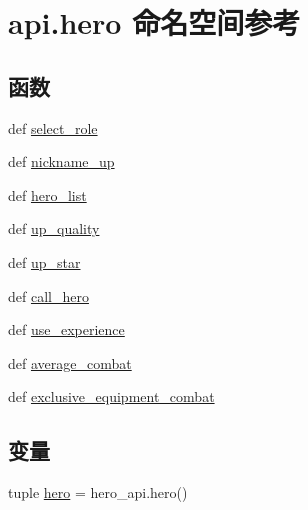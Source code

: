 \hypertarget{namespaceapi_1_1hero}{\section{api.\-hero 命名空间参考}
\label{namespaceapi_1_1hero}
}
\subsection*{函数}
\begin{DoxyCompactItemize}
\item 
def \hyperlink{namespaceapi_1_1hero_a4405f1ac80d211bc2ffa406989dac39f}{select\-\_\-role}
\item 
def \hyperlink{namespaceapi_1_1hero_a5d3c75571b917d96c0dd093b77786034}{nickname\-\_\-up}
\item 
def \hyperlink{namespaceapi_1_1hero_ab0d2bb6223c08a0cfe6ade810d241dc7}{hero\-\_\-list}
\item 
def \hyperlink{namespaceapi_1_1hero_a718a58909c5d0de9ef09308a6c1fa3f4}{up\-\_\-quality}
\item 
def \hyperlink{namespaceapi_1_1hero_a761112e7af7b2584e11eb2cf994a2a0f}{up\-\_\-star}
\item 
def \hyperlink{namespaceapi_1_1hero_a5041ff294046dfe481dc3843ec47b18b}{call\-\_\-hero}
\item 
def \hyperlink{namespaceapi_1_1hero_adead7421666e1a3e8279cc1633e28ba4}{use\-\_\-experience}
\item 
def \hyperlink{namespaceapi_1_1hero_a468e2dddad6f615fc81a75558c5bf080}{average\-\_\-combat}
\item 
def \hyperlink{namespaceapi_1_1hero_a68f0a491c12ef0af8d80f41f9a3d07b4}{exclusive\-\_\-equipment\-\_\-combat}
\end{DoxyCompactItemize}
\subsection*{变量}
\begin{DoxyCompactItemize}
\item 
tuple \hyperlink{namespaceapi_1_1hero_ae3a416896a7b1d5c6a5c11ab4bcfdb8b}{hero} = hero\-\_\-api.\-hero()
\end{DoxyCompactItemize}


